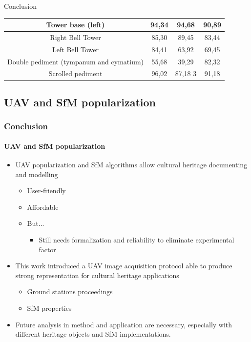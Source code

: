 \documentclass{beamer}
\begin{document}
\begin{frame}{Conclusion}
{\begin{table}
\begin{center}
\begin{tabular}{|c|c|c|c|}
              \hline
              Tower base (left) & 94,34 & 94,68 & 90,89 \\
              \hline
              Right Bell Tower & 85,30 & 89,45 & 83,44 \\
              \hline
              Left Bell Tower  & 84,41 & 63,92 & 69,45 \\
              \hline
              Double pediment (tympanum and cymatium) & 55,68 & 39,29 & 82,32 \\
              \hline
              Scrolled pediment & 96,02 & 87,18 3 & 91,18 \\
              \hline
        \end{tabular}
        \end{center}

    \end{table}}
    
\end{frame}

\subsection{UAV and SfM popularization}
\begin{frame}
  \frametitle{Conclusion}
  \framesubtitle{UAV and SfM popularization}
  \justifying
    \begin{itemize}
        \item UAV popularization and SfM algorithms allow cultural heritage documenting and modelling
        \begin{itemize}[<+-| alert@+>]
            \item User-friendly
            \item Affordable
            \item But...
            \begin{itemize}
                \item Still needs formalization and reliability to eliminate experimental factor
            \end{itemize}
        \end{itemize}

        \item This work introduced a UAV image acquisition protocol able to produce strong representation for cultural heritage applications
        \vspace{-.4cm}
        \begin{itemize}[<+-| alert@+>]
            \item Ground stations proceedings
            \item SfM properties
        \end{itemize}
        \item Future analysis in method and application are necessary, especially with different heritage objects and SfM implementations.
    \end{itemize}
\end{frame}
\end{document}
